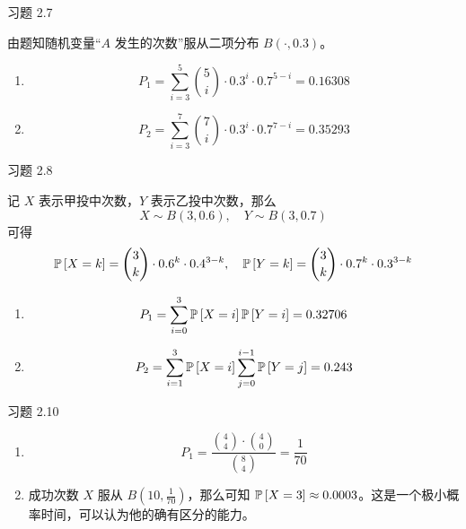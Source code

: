 \begin{problem}
    习题 2.7
    \begin{solution}
        由题知随机变量“$A$ 发生的次数”服从二项分布 $B(\cdot, 0.3)$。
        \begin{enumerate}
            \item[\textbf{1)}]
            $$
            P_1 = \sum_{i = 3}^{5} \binom{5}{i} \cdot 0.3^{i} \cdot 0.7^{5 - i} = 0.16308
            $$
            \item[\textbf{2)}]
            $$
            P_2 = \sum_{i = 3}^{7} \binom{7}{i} \cdot 0.3^{i} \cdot 0.7^{7 - i} = 0.35293
            $$
        \end{enumerate}
    \end{solution}
\end{problem}

\begin{problem}
    习题 2.8
    \begin{solution}
        记 $X$ 表示甲投中次数，$Y$ 表示乙投中次数，那么
        $$
        X \sim B(3, 0.6), \quad Y \sim B(3, 0.7)
        $$
        可得
        $$
        \operatorname{\mathbb{P}}\left[X = k\right] = \binom{3}{k} \cdot 0.6^{k} \cdot 0.4^{3 - k}, \quad \operatorname{\mathbb{P}}\left[Y = k\right] = \binom{3}{k} \cdot 0.7^{k} \cdot 0.3^{3 - k}
        $$
        \begin{enumerate}
            \item[\textbf{1)}]
            $$
            P_1 = \sum_{i = 0}^{3} \operatorname{\mathbb{P}}\left[X = i\right] \operatorname{\mathbb{P}}\left[Y = i\right] = 0.32706
            $$
            \item[\textbf{2)}]
            $$
            P_2 = \sum_{i = 1}^{3} \operatorname{\mathbb{P}}\left[X = i\right] \sum_{j = 0}^{i - 1} \operatorname{\mathbb{P}}\left[Y = j\right] = 0.243
            $$
        \end{enumerate}
    \end{solution}
\end{problem}

\begin{problem}
    习题 2.10
    \begin{solution}
        \begin{enumerate}
            \item[\textbf{1)}]
            $$
            P_1 = \frac{\binom{4}{4} \cdot \binom{4}{0}}{\binom{8}{4}} = \frac{1}{70}
            $$
            \item[\textbf{2)}] 成功次数 $X$ 服从 $B(10, \frac{1}{70})$，那么可知 $\operatorname{\mathbb{P}}\left[X = 3\right] \approx 0.0003$。这是一个极小概率时间，可以认为他的确有区分的能力。
        \end{enumerate}
    \end{solution}
\end{problem}

